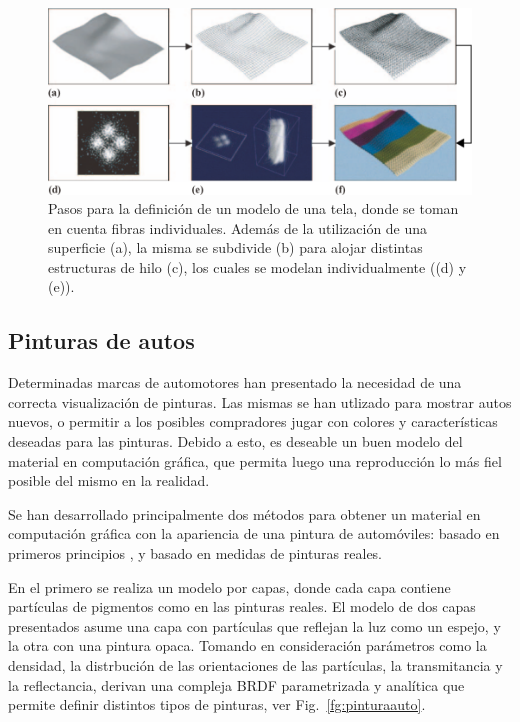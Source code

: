 \begin{figure}
\center
\includegraphics[width=13cm]{figures/tela}
\caption[Pasos para la definición de un modelo de una tela]{Pasos para la definición de un modelo de una tela, donde se toman en cuenta fibras individuales. Además de la utilización de una superficie (a), la misma se subdivide (b) para alojar distintas estructuras de hilo (c), los cuales se modelan individualmente ((d) y (e)).}
\label{fg:tela}
\end{figure}

\subsection{Pinturas de autos}
Determinadas marcas de automotores han presentado la necesidad de una correcta visualización de pinturas.
Las mismas se han utlizado para mostrar autos nuevos, o permitir a los posibles compradores jugar con colores y características deseadas para las pinturas.
Debido a esto, es deseable un buen modelo del material en computación gráfica, que permita luego una reproducción lo más fiel posible del mismo en la realidad.

Se han desarrollado principalmente dos métodos para obtener un material en computación gráfica con la apariencia de una pintura de automóviles: basado en primeros principios \cite{Ershov2001}, y basado en medidas de pinturas reales.

En el primero se realiza un modelo por capas, donde cada capa contiene partículas de pigmentos como en las pinturas reales.
El modelo de dos capas presentados asume una capa con partículas que reflejan la luz como un espejo, y la otra con una pintura opaca.
Tomando en consideración parámetros como la densidad, la distrbución de las orientaciones de las partículas, la transmitancia y la reflectancia, derivan una compleja BRDF parametrizada y analítica que permite definir distintos tipos de pinturas, ver Fig.~\ref{fg:pinturaauto}.

